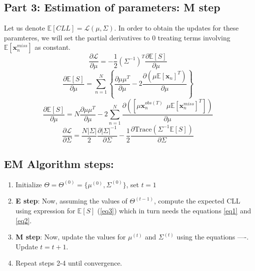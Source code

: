 \documentclass[a4paper,11pt]{article}
\begin{document}
\begin{mlsolution}
\subsection{Part 3: Estimation of parameters: M step}
Let us denote $\mathbb{E}[CLL] = \mathcal{L}(\mu, \Sigma)$. In order to obtain the updates for these paramteres, we will set the partial derivatives to 0 treating terms involving $\mathbb{E}[\textbf{x}^{miss}_n]$ as constant. 
\[
\frac{\partial \mathcal{L}}{\partial \mu} = -\frac{1}{2}(\Sigma^{-1})^{T}\frac{\partial \mathbb{E}[S]}{\partial \mu}
\]
\[
\frac{\partial \mathbb{E}[S]}{\partial \mu} = \sum_{n=1}^{N} \left\lbrace \frac{\partial \mu\mu^{T}}{\partial \mu} -2\frac{\partial (\mu \mathbb{E}[\textbf{x}_n]^{T})}{\partial \mu}\right\rbrace 
\]
\[
\frac{\partial \mathbb{E}[S]}{\partial \mu} = N\frac{\partial \mu\mu^{T}}{\partial \mu}  - 2\sum_{n=1}^{N}\frac{\partial ([\mu \textbf{x}_{n}^{obs(T)}  \ \ \mu \mathbb{E}[\textbf{x}_{n}^{miss}]^{T}])}{\partial \mu}
\]
\[
\frac{\partial \mathcal{L}}{\partial \Sigma} = \frac{N|\Sigma|}{2}\frac{\partial |\Sigma|^{-1}}{\partial \Sigma} - \frac{1}{2} \frac{\partial \text{Trace}(\Sigma^{-1}\mathbb{E}[S])}{\partial \Sigma}
\]

\subsection{EM Algorithm steps:}
\begin{enumerate}
	\item Initialize $\Theta = \Theta^{(0)} = \{\mu^{(0)}, \Sigma^{(0)}\}$, set $t = 1$
	\item \textbf{E step}: Now, assuming the values of $\Theta^{(t-1)}$, compute the expected CLL using expression for $\mathbb{E}[S]$ (\ref{eq3}) which in turn needs the equations \ref{eq1} and \ref{eq2}.
	\item \textbf{M step}: Now, update the values for $\mu^{(t)}$ and $\Sigma^{(t)}$ using the equations ----. Update $t = t+1$.
	\item Repeat steps 2-4 until convergence.
\end{enumerate}

\end{mlsolution}
\end{document}

